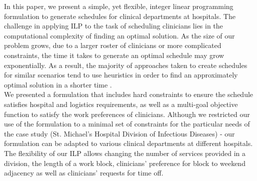 In this paper, we present a simple, yet flexible, integer linear programming formulation to generate schedules for clinical departments at hospitals.
The challenge in applying ILP to the task of scheduling clinicians lies in the computational complexity of finding an optimal solution. As the size of our problem grows, due to a larger roster of clinicians or more complicated constraints, the time it takes to generate an optimal schedule may grow exponentially.
As a result, the majority of approaches taken to create schedules for similar scenarios tend to use heuristics in order to find an approximately optimal solution in a shorter time \cite{burke_state_2004}. \\  %


We presented a formulation that includes hard constraints to ensure the schedule satisfies hospital and logistics requirements, as well as a multi-goal objective function to satisfy the work preferences of clinicians.
Although we restricted our use of the formulation to a minimal set of constraints for the particular needs of the case study (St. Michael's Hospital Division of Infectious Diseases) - our formulation can be adapted to various clinical departments at different hospitals. The flexibility of our ILP allows changing the number of services provided in a division, the length of a work block, clinicians' preference for block to weekend adjacency as well as clinicians' requests for time off. \\

